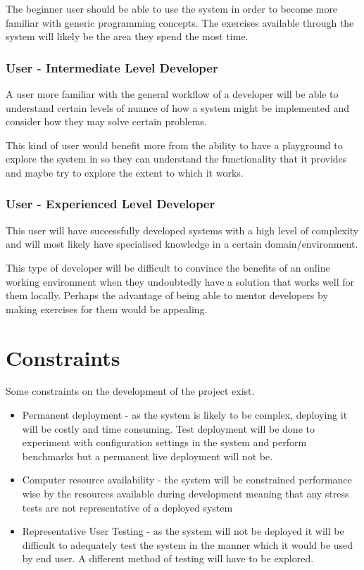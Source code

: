 The beginner user should be able to use the system in order to become more familiar with generic programming concepts. The exercises available through the system will likely be the area they spend the most time.

\subsubsection{User - Intermediate Level Developer}
A user more familiar with the general workflow of a developer will be able to understand certain levels of nuance of how a system might be implemented and consider how they may solve certain problems.

This kind of user would benefit more from the ability to have a playground to explore the system in so they can understand the functionality that it provides and maybe try to explore the extent to which it works.

\subsubsection{User - Experienced Level Developer}
This user will have successfully developed systems with a high level of complexity and will most likely have specialised knowledge in a certain domain/environment.

This type of developer will be difficult to convince the benefits of an online working environment when they undoubtedly have a solution that works well for them locally. Perhaps the advantage of being able to mentor developers by making exercises for them would be appealing.

\section{Constraints} \label{section:probart-constraints}
Some constraints on the development of the project exist.

\begin{itemize}
    \item Permanent deployment - as the system is likely to be complex, deploying it will be costly and time consuming. Test deployment will be done to experiment with configuration settings in the system and perform benchmarks but a permanent live deployment will not be.
    \item Computer resource availability - the system will be constrained performance wise by the resources available during development meaning that any stress tests are not representative of a deployed system
    \item Representative User Testing - as the system will not be deployed it will be difficult to adequately test the system in the manner which it would be used by end user. A different method of testing will have to be explored.
\end{itemize}

